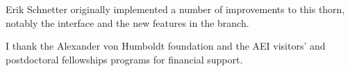 Erik Schnetter originally implemented a number of improvements to
this thorn, notably the  interface and the
new features in the  branch.

I thank the Alexander von Humboldt foundation and the AEI visitors'
and postdoctoral fellowships programs for financial support.







